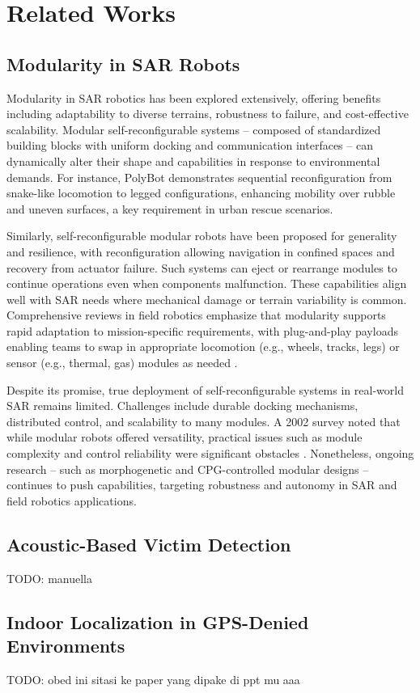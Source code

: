 \section{Related Works}

\subsection{Modularity in SAR Robots}
Modularity in SAR robotics has been explored extensively, offering benefits including adaptability to diverse terrains, robustness to failure, and cost-effective scalability. Modular self-reconfigurable systems -- composed of standardized building blocks with uniform docking and communication interfaces -- can dynamically alter their shape and capabilities in response to environmental demands. For instance, PolyBot \cite{PolyBot} demonstrates sequential reconfiguration from snake-like locomotion to legged configurations, enhancing mobility over rubble and uneven surfaces, a key requirement in urban rescue scenarios.

Similarly, self-reconfigurable modular robots have been proposed for generality and resilience, with reconfiguration allowing navigation in confined spaces and recovery from actuator failure. Such systems can eject or rearrange modules to continue operations even when components malfunction. These capabilities align well with SAR needs where mechanical damage or terrain variability is common. Comprehensive reviews in field robotics emphasize that modularity supports rapid adaptation to mission-specific requirements, with plug-and-play payloads enabling teams to swap in appropriate locomotion (e.g., wheels, tracks, legs) or sensor (e.g., thermal, gas) modules as needed \cite{ModularRobotic}.

Despite its promise, true deployment of self-reconfigurable systems in real-world SAR remains limited. Challenges include durable docking mechanisms, distributed control, and scalability to many modules. A 2002 survey \cite{wiredBots2002} noted that while modular robots offered versatility, practical issues such as module complexity and control reliability were significant obstacles \cite{}. Nonetheless, ongoing research -- such as morphogenetic and CPG-controlled modular designs \cite{CPGLocomotion} -- continues to push capabilities, targeting robustness and autonomy in SAR and field robotics applications.

\subsection{Acoustic-Based Victim Detection}
TODO: manuella

\subsection{Indoor Localization in GPS-Denied Environments}
TODO: obed \cite{WSNCentroid} ini sitasi ke paper yang dipake di ppt mu
aaa \cite{nagah2021enhanced}
